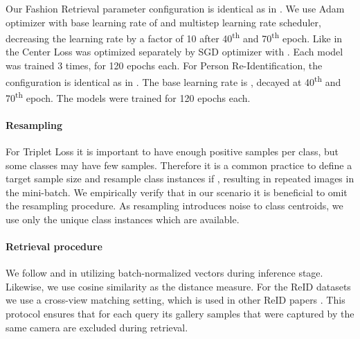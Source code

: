 \documentclass[sigconf,nonacm]{acmart}
\begin{document}
Our Fashion Retrieval parameter configuration is
identical as in \cite{Wieczorek2020}. We use Adam optimizer with base learning rate of  and multistep learning rate scheduler, decreasing the learning rate by a factor of 10 after 40\textsuperscript{th} and 70\textsuperscript{th} epoch. Like in \cite{Wieczorek2020, luo_reid_strong_baseline} the Center Loss was optimized separately by SGD optimizer with . Each model was trained 3 times, for 120 epochs each. 
For Person Re-Identification, the configuration is identical as in \cite{luo_reid_strong_baseline}. The  base learning rate is , decayed at 40\textsuperscript{th} and 70\textsuperscript{th} epoch. The models were trained for 120 epochs each.

\paragraph{Resampling}

For Triplet Loss it is important to have enough positive samples per class, but some classes may have few samples. Therefore it is a common practice to define a target sample size  and resample class instances if , resulting in repeated images in the mini-batch. We empirically verify that in our scenario it is beneficial to omit the resampling procedure. As resampling introduces noise to class centroids, we use only the unique class instances which are available.

\paragraph{Retrieval procedure} We follow \cite{luo_reid_strong_baseline} and \cite{Wieczorek2020}  in utilizing batch-normalized vectors during inference stage. Likewise, we use cosine similarity as the distance measure.
For the ReID datasets we use a cross-view matching setting, which is used in other ReID papers \cite{luo_reid_strong_baseline, Wang2019_reid_spatial_temporal}. This protocol ensures that for each query its gallery samples that were captured by the same camera are excluded during retrieval. 
\end{document}
